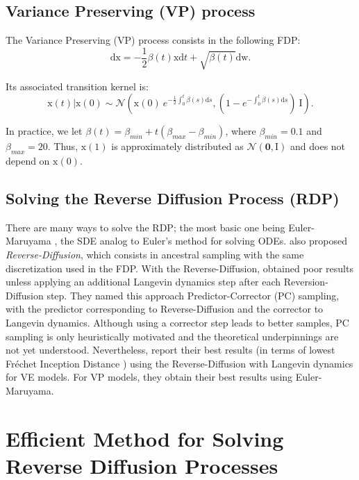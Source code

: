 \documentclass{article}
\newcommand{\Zero}{\boldsymbol{0}}
\newcommand{\I}{\boldsymbol{\mathrm{I}}}
\newcommand{\x}{\boldsymbol{\mathrm{x}}}
\newcommand{\w}{\boldsymbol{\mathrm{w}}}
\newcommand{\dr}{\mathrm{d}}
\begin{document}
\subsection{Variance Preserving (VP) process}

The Variance Preserving (VP) process consists in the following FDP:
\begin{equation*}
    \dr \x = - \frac{1}{2} \beta(t) \x \dr t + \sqrt{\beta(t)} \dr\w.
\end{equation*}

Its associated transition kernel is:
\begin{equation*}
    \x(t)|\x(0) \sim \mathcal{N}(\x(0)~e^{-\frac{1}{2} \int_{0}^t \beta(s) \dr s}, (1- e^{-\int_{0}^t \beta(s) \dr s})~ \I ).
\end{equation*}

In practice, we let $\beta(t) = \beta_{min} + t \left( \beta_{max} - \beta_{min} \right)$, where $\beta_{min} = 0.1$ and $\beta_{max}=20$.
Thus, $\x(1)$ is approximately distributed as $\mathcal{N}(\Zero, \I)$ and does not depend on $\x(0)$.

\subsection{Solving the Reverse Diffusion Process (RDP)}

There are many ways to solve the RDP; the most basic one being Euler-Maruyama \citep{kloeden1992stochastic}, the SDE analog to Euler's method for solving ODEs.
\citet{song2020score} also proposed {\em Reverse-Diffusion}, which consists in ancestral sampling \citep{ho2020denoising} with the same discretization used in the FDP. With the Reverse-Diffusion, \citep{song2020score} obtained poor results unless applying an additional Langevin dynamics step after each Reversion-Diffusion step. They named this approach Predictor-Corrector (PC) sampling, with the predictor corresponding to Reverse-Diffusion and the corrector to Langevin dynamics. 
Although using a corrector step leads to better samples, PC sampling is only heuristically motivated and the theoretical underpinnings are not yet understood.
Nevertheless, \citep{song2020score} report their best results (in terms of lowest Fréchet Inception Distance \citep{heusel2017gans}) using the Reverse-Diffusion with Langevin dynamics for VE models. For VP models, they obtain their best results using Euler-Maruyama.


\section{Efficient Method for Solving Reverse Diffusion Processes}
\end{document}
